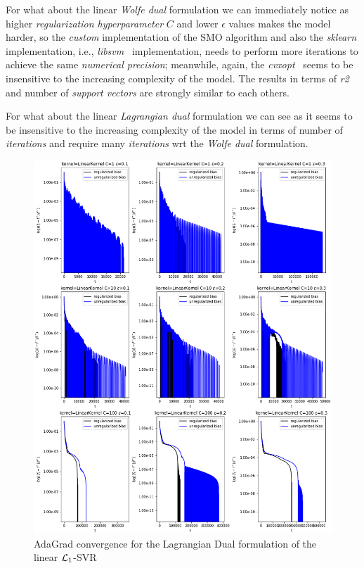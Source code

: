 

For what about the linear \emph{Wolfe dual} formulation we can immediately notice as higher \emph{regularization hyperparameter} $C$ and lower $\epsilon$ values makes the model harder, so the \emph{custom} implementation of the SMO algorithm and also the \emph{sklearn} implementation, i.e., \emph{libsvm}~\cite{chang2011libsvm} implementation, needs to perform more iterations to achieve the same \emph{numerical precision}; meanwhile, again, the \emph{cvxopt}~\cite{vandenberghe2010cvxopt} seems to be insensitive to the increasing complexity of the model. The results in terms of \emph{r2} and number of \emph{support vectors} are strongly similar to each others.



For what about the linear \emph{Lagrangian dual} formulation we can see as it seems to be insensitive to the increasing complexity of the model in terms of number of \emph{iterations} and require many \emph{iterations} wrt the \emph{Wolfe dual} formulation.

\begin{figure}[H]
	\centering
	\includegraphics[scale=0.55]{img/linear_lagrangian_dual_l1_svr_loss_history}
	\caption{AdaGrad convergence for the Lagrangian Dual formulation of the linear $\protect \mathcal{L}_1$-SVR}
	\label{fig:linear_lagrangian_dual_l1_svr_loss_history}
\end{figure}

